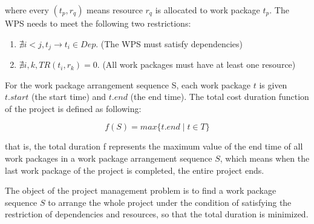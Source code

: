 where every $(t_p, r_q)$ means resource $r_q$ is allocated to work package $t_p$.
The WPS needs to meet the following two restrictions:

\begin{enumerate}
\item $\nexists i < j, t_j \rightarrow t_i \in Dep$.
  (The WPS must satisfy dependencies)
\item $\nexists i, k, TR(t_i, r_k) = 0$.
  (All work packages must have at least one resource)
\end{enumerate}

For the work package arrangement sequence S, each work package $t$ is
given $t.start$ (the start time) and $t.end$ (the end time).  The
total cost duration function of the project is defined as following:

\begin{equation}
f(S) = max\{t.end \mid t \in T\}
\end{equation}

that is, the total duration f represents the maximum value of the end
time of all work packages in a work package arrangement sequence $S$,
which means when the last work package of the project is completed,
the entire project ends.

The object of the project management problem is to find a work
package sequence $S$ to arrange the whole project under the condition
of satisfying the restriction of dependencies and resources, so that
the total duration is minimized.


